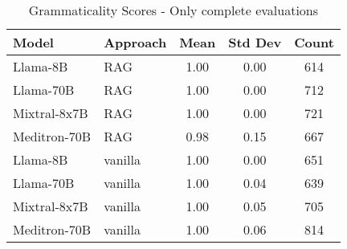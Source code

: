 \begin{table}[h]
\centering
\begin{tabular}{llccc}
\toprule
Model & Approach & Mean & Std Dev & Count \\
\midrule
Llama-8B & RAG & 1.00 & 0.00 & 614 \\
Llama-70B & RAG & 1.00 & 0.00 & 712 \\
Mixtral-8x7B & RAG & 1.00 & 0.00 & 721 \\
Meditron-70B & RAG & 0.98 & 0.15 & 667 \\
Llama-8B & vanilla & 1.00 & 0.00 & 651 \\
Llama-70B & vanilla & 1.00 & 0.04 & 639 \\
Mixtral-8x7B & vanilla & 1.00 & 0.05 & 705 \\
Meditron-70B & vanilla & 1.00 & 0.06 & 814 \\
\bottomrule
\end{tabular}
\caption{Grammaticality Scores - Only complete evaluations}
\label{tab:grammaticality_complete}
\end{table}